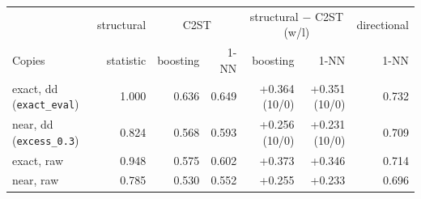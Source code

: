 \begin{tabular}{lrrrrrr}\toprule
 & structural & \multicolumn{2}{c}{C2ST} & \multicolumn{2}{c}{structural $-$ C2ST (w/l)} & directional\\
Copies & statistic & boosting & 1-NN & boosting & 1-NN & 1-NN\\\midrule
exact, dd (\texttt{exact\_eval}) & 1.000 & 0.636 & 0.649 & +0.364 (10/0) & +0.351 (10/0) & 0.732\\
near, dd (\texttt{excess\_0.3}) & 0.824 & 0.568 & 0.593 & +0.256 (10/0) & +0.231 (10/0) & 0.709\\
exact, raw & 0.948 & 0.575 & 0.602 & +0.373 & +0.346 & 0.714\\
near, raw & 0.785 & 0.530 & 0.552 & +0.255 & +0.233 & 0.696\\
\bottomrule\end{tabular}

